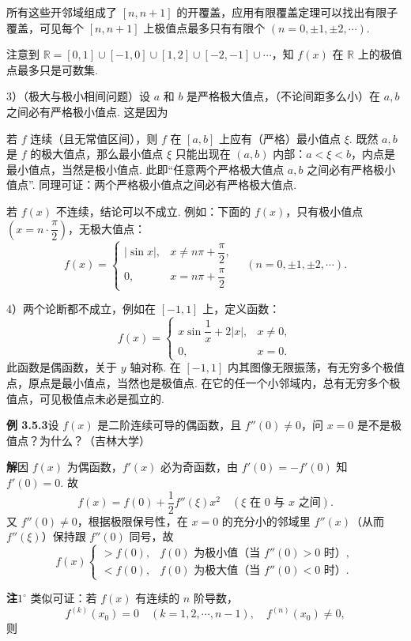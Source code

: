 \documentclass[UTF8, 12pt, fontset=fandol, oneside]{ctexart}
\begin{document}
所有这些开邻域组成了 $[n,n+1]$ 的开覆盖，应用有限覆盖定理可以找出有限子覆盖，可见每个 $[n,n+1]$ 上极值点最多只有有限个 $(n=0,\pm1,\pm2,\cdots)$.

注意到 $\mathbb R=[0,1]\cup[-1,0]\cup[1,2]\cup[-2,-1]\cup\cdots$，知 $f(x)$ 在 $\mathbb R$ 上的极值点最多只是可数集.

3）（极大与极小相间问题）设 $a$ 和 $b$ 是严格极大值点，（不论间距多么小）在 $a,b$ 之间必有严格极小值点. 这是因为

若 $f$ 连续（且无常值区间），则 $f$ 在 $[a,b]$ 上应有（严格）最小值点 $\xi$. 既然 $a,b$ 是 $f$ 的极大值点，那么最小值点 $\xi$ 只能出现在 $(a,b)$ 内部：$a<\xi<b$，内点是最小值点，当然是极小值点. 此即“任意两个严格极大值点 $a,b$ 之间必有严格极小值点”. 同理可证：两个严格极小值点之间必有严格极大值点.

若 $f(x)$ 不连续，结论可以不成立. 例如：下面的 $f(x)$，只有极小值点 $\left(x=n\cdot\dfrac\pi2\right)$，无极大值点：
\[
  f(x)=
  \begin{cases}
  |\sin x|, & x\ne n\pi+\dfrac\pi2,\\
  0, & x=n\pi+\dfrac\pi2
  \end{cases}
  \quad(n=0,\pm1,\pm2,\cdots).
\]

4）两个论断都不成立，例如在 $[-1,1]$ 上，定义函数：
\[
  f(x)=
  \begin{cases}
  x\sin\dfrac1x+2|x|, & x\ne0,\\
  0, & x=0.
  \end{cases} \tag{1}
\]
此函数是偶函数，关于 $y$ 轴对称. 在 $[-1,1]$ 内其图像无限振荡，有无穷多个极值点，原点是最小值点，当然也是极值点. 在它的任一个小邻域内，总有无穷多个极值点，可见极值点未必是孤立的.

\noindent\textbf{例 3.5.3}\quad 设 $f(x)$ 是二阶连续可导的偶函数，且 $f''(0)\ne0$，问 $x=0$ 是不是极值点？为什么？（吉林大学）

\noindent\textbf{解}\quad 因 $f(x)$ 为偶函数，$f'(x)$ 必为奇函数，由 $f'(0)=-f'(0)$ 知 $f'(0)=0$. 故
\[
  f(x)=f(0)+\frac12f''(\xi)x^2\quad(\xi\text{ 在 }0\text{ 与 }x\text{ 之间}). \tag{1}
\]
又 $f''(0)\ne0$，根据极限保号性，在 $x=0$ 的充分小的邻域里 $f''(x)$（从而 $f''(\xi)$）保持跟 $f''(0)$ 同号，故
\[
  f(x)
  \begin{cases}
  >f(0), & f(0)\text{ 为极小值（当 }f''(0)>0\text{ 时）},\\
  <f(0), & f(0)\text{ 为极大值（当 }f''(0)<0\text{ 时）}.
  \end{cases}
\]

\noindent\textbf{注}\quad $1^\circ$ 类似可证：若 $f(x)$ 有连续的 $n$ 阶导数，
\[
  f^{(k)}(x_0)=0\quad(k=1,2,\cdots,n-1),\quad f^{(n)}(x_0)\ne0,
\]
则
\end{document}
